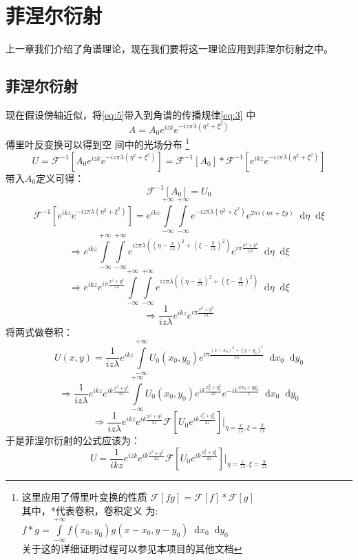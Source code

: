 \documentclass{article}
\newcommand*{\dif}{\mathop{}\!\mathrm{d}}
\begin{document}
\section{菲涅尔衍射}
上一章我们介绍了角谱理论，现在我们要将这一理论应用到菲涅尔衍射之中。
\subsection{菲涅尔衍射}

现在假设傍轴近似，将\ref{eq:5}带入到角谱的传播规律\ref{eq:3}
中\[A=A_0e^{izk}e^{-iz\pi\lambda(\eta^2+\xi^2)}\]傅里叶反变换可以得到空
间中的光场分布
\footnote{
  这里应用了傅里叶变换的性质
  $\mathscr{F}[fg]=\mathscr{F}[f]*\mathscr{F}[g]$\\
  其中，*代表卷积，卷积定义
  为:$f*g=\int\limits_{-\infty}^{+\infty}f(x_0,y_0)g(x-x_0,y-y_0)\dif
  x_0\dif y_0$
  \\关于这的详细证明过程可以参见本项目的其他文档}
\[U=\mathscr{F}^{-1}[A_0e^{izk}e^{-iz\pi\lambda(\eta^{2}+\xi^2)}]=\mathscr{F}^{-1}[A_0]*\mathscr{F}^{-1}[e^{ikz}e^{-iz\pi\lambda(\eta^2+\xi^2)}]\]
带入$A_0$定义可得：
\[\mathscr{F}^{-1}[A_0]=U_0\]
\[
  \mathscr{F}^{-1}[e^{ikz}e^{-iz\pi\lambda(\eta^2+\xi^2)}]=e^{ikz}\int\limits_{-\infty}^{+\infty}\int\limits_{-\infty}^{+\infty}e^{-iz\pi\lambda(\eta^2+\xi^2)}e^{2\pi
    i(\eta x+\xi y)}\dif\eta\dif\xi\]
\[\Rightarrow
  e^{ikz}\int\limits_{-\infty}^{+\infty}\int\limits_{-\infty}^{+\infty}e^{iz\pi\lambda((\eta-\frac{x}{z\lambda})^2+(\xi-\frac{y}{z\lambda})^2)}e^{i\pi
    \frac{x^2+y^2}{z\lambda}}\dif\eta\dif\xi\]
\[\Rightarrow e^{ikz}e^{i\pi
    \frac{x^2+y^2}{z\lambda}}\int\limits_{-\infty}^{+\infty}\int\limits_{-\infty}^{+\infty}e^{iz\pi\lambda((\eta-\frac{x}{z\lambda})^2+(\xi-\frac{y}{z\lambda})^2)}\dif\eta\dif\xi\]
\[\Rightarrow \frac{1}{iz\lambda}e^{ikz}e^{i\pi \frac{x^2+y^2}{z\lambda}}\]
将两式做卷积：
\[U(x,y)=\frac{1}{iz\lambda}e^{ikz}\int\limits_{-\infty}^{+\infty}U_0(x_0,y_0)e^{i\pi
    \frac{(x-x_0)^2+(y-y_0)^2}{z\lambda}}\dif x_0\dif y_0\]
\[\Rightarrow \frac{1}{iz\lambda}e^{ikz}e^{ik
    \frac{x^2+y^2}{2z}}\int\limits_{-\infty}^{+\infty}U_0(x_0,y_0)e^{ik
    \frac{x_0^2+y_0^2}{2z}}e^{-ik \frac{xx_0+yy_0}{z}}\dif x_0\dif
  y_0\]
\[\Rightarrow \frac{1}{iz\lambda}e^{ikz}e^{ik
    \frac{x^2+y^2}{2z}}\mathscr{F}[U_0e^{ik
    \frac{x_0^2+y_0^2}{2z}}]|_{\eta=\frac{x}{z\lambda},\xi=\frac{y}{z\lambda}}\]
于是菲涅尔衍射的公式应该为：
\begin{equation}
  \label{eq:6}
  U=\frac{1}{ikz}e^{izk}e^{ik \frac{x^2+y^2}{2z}}\mathscr{F}[U_0e^{ik \frac{x_0^2+y_0^2}{2z}}]|_{\eta=\frac{x}{z\lambda},\xi=\frac{y}{z\lambda}}
\end{equation}
\end{document}
